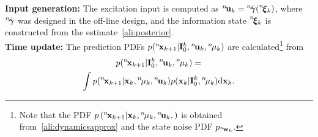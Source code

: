 \documentclass[conference,letterpaper]{IEEEtran}
\def\nth{\prescript{n\!}{}}
\begin{document}
\textbf{Input generation:} The excitation input is computed as $\nth{\bfu}_{k}=\nth{\bar{\bfgamma}}(\nth{\bfxi}_k)$, where $\nth{\bar{\bfgamma}}$ was designed in the off-line design, and the information state $\nth{\bfxi}_k$ is constructed from the estimate~\eqref{ali:posterior}.\\
\textbf{Time update:} The prediction PDFs $p(\nth{\bfx}_{k+1}\vert \bfI^{k}_{0},\nth{\bfu}_{k},\nth{\mu}_{k} )$  are calculated\footnote{Note that the PDF $p \left(\nth{\bfx}_{k+1} \vert \bfx_{k},\nth{\mu}_{k},\nth{\bfu}_{k},\right)$ is obtained from~\eqref{ali:dynamicsapprox} and the state noise PDF $p_{\nth{\bfw}_k}$.} from 
\begin{multline*}
	p(\nth{\bfx}_{k+1} \vert \bfI^{k}_{0}, \nth{\bfu}_{k},\nth{\mu}_{k}) =\\
	\int  p (\nth{\bfx}_{k+1} \vert \bfx_{k}, \nth{\mu}_{k}, \nth{\bfu}_{k} ) p(\bfx_{k} \vert\bfI^{k}_{0},\nth{\mu}_{k})\mathrm{d}\bfx_{k}.
\end{multline*}
\end{document}
